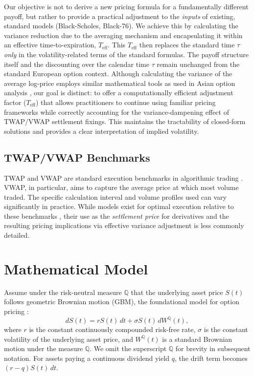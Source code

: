 \documentclass[11pt]{article}
\theoremstyle{plain}
\begin{document}
Our objective is not to derive a new pricing formula for a fundamentally different payoff, but rather to provide a practical adjustment to the \textit{inputs} of existing, standard models (Black-Scholes, Black-76). We achieve this by calculating the variance reduction due to the averaging mechanism and encapsulating it within an effective time-to-expiration, $T_{\mathrm{eff}}$. This $T_{\mathrm{eff}}$ then replaces the standard time $\tau$ \textit{only} in the volatility-related terms of the standard formulas. The payoff structure itself and the discounting over the calendar time $\tau$ remain unchanged from the standard European option context. Although calculating the variance of the average log-price employs similar mathematical tools as used in Asian option analysis \citep[e.g.,][]{kemna1990pricing}, our goal is distinct: to offer a computationally efficient adjustment factor ($T_{\mathrm{eff}}$) that allows practitioners to continue using familiar pricing frameworks while correctly accounting for the variance-dampening effect of TWAP/VWAP settlement fixings. This maintains the tractability of closed-form solutions and provides a clear interpretation of implied volatility.

\subsection{TWAP/VWAP Benchmarks}
TWAP and VWAP are standard execution benchmarks in algorithmic trading \citep{kissell2013science}. VWAP, in particular, aims to capture the average price at which most volume traded. The specific calculation interval and volume profiles used can vary significantly in practice. While models exist for optimal execution relative to these benchmarks \citep[e.g.,][]{almgren2001optimal}, their use as the \textit{settlement price} for derivatives and the resulting pricing implications via effective variance adjustment is less commonly detailed.

\section{Mathematical Model}
\label{sec:model}

Assume under the risk-neutral measure $\mathbb{Q}$ that the underlying asset price $S(t)$ follows geometric Brownian motion (GBM), the foundational model for option pricing \citep{blackscholes1973pricing, merton1973theory, hull2006options}:
\begin{equation} \label{eq:gbm}
    dS(t) = r S(t)\,dt + \sigma S(t)\,dW^{\mathbb{Q}}(t),
\end{equation}
where $r$ is the constant continuously compounded risk-free rate, $\sigma$ is the constant volatility of the underlying asset price, and $W^{\mathbb{Q}}(t)$ is a standard Brownian motion under the measure $\mathbb{Q}$. We omit the superscript $\mathbb{Q}$ for brevity in subsequent notation. For assets paying a continuous dividend yield $q$, the drift term becomes $(r-q)S(t)\,dt$.
\end{document}
